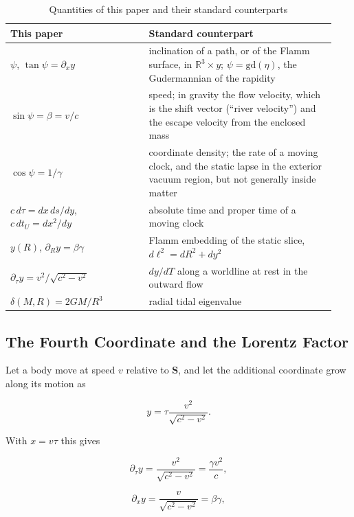 \documentclass[anonymous]{iopjournal}
\begin{document}
\begin{table}[h]
\caption{Quantities of this paper and their standard counterparts}%
\label{table_dictionary}
\begin{tabular}{@{}p{0.40\linewidth}p{0.54\linewidth}@{}}
\toprule
This paper & Standard counterpart\\
\midrule
$\psi$, $\tan\psi=\partial_x y$ & inclination of a path, or of the Flamm surface, in $\mathbb{R}^3\times y$; $\psi=\mathrm{gd}(\eta)$, the Gudermannian of the rapidity\\
$\sin\psi=\beta=v/c$ & speed; in gravity the flow velocity, which is the shift vector (``river velocity'') and the escape velocity from the enclosed mass\\
$\cos\psi=1/\gamma$ & coordinate density; the rate of a moving clock, and the static lapse in the exterior vacuum region, but not generally inside matter\\
$c\,d\tau=dx\,ds/dy$, $c\,dt_U=dx^2/dy$ & absolute time and proper time of a moving clock\\
$y(R)$, $\partial_R y=\beta\gamma$ & Flamm embedding of the static slice, $d\ell^2=dR^2+dy^2$\\
$\partial_\tau y=v^2/\sqrt{c^2-v^2}$ & $dy/dT$ along a worldline at rest in the outward flow\\
$\delta(M,R)=2GM/R^3$ & radial tidal eigenvalue\\
\bottomrule
\end{tabular}
\end{table}

\subsection{The Fourth Coordinate and the Lorentz Factor}\label{sec_fourth_coordinate}

Let a body move at speed $v$ relative to $\mathbf{S}$, and let the additional coordinate grow along its motion as

\begin{equation}\label{eq_dy_definition}
    y=\tau\frac{v^2}{\sqrt{c^2-v^2}} .
\end{equation}

With $x=v\tau$ this gives

\begin{equation}\label{eq_dy_dtau}
    \partial_\tau y=\frac{v^2}{\sqrt{c^2-v^2}}=\frac{\gamma v^2}{c},
\end{equation}

\begin{equation}\label{eq_dy_dx}
    \partial_x y=\frac{v}{\sqrt{c^2-v^2}}=\beta\gamma ,
\end{equation}
\end{document}
